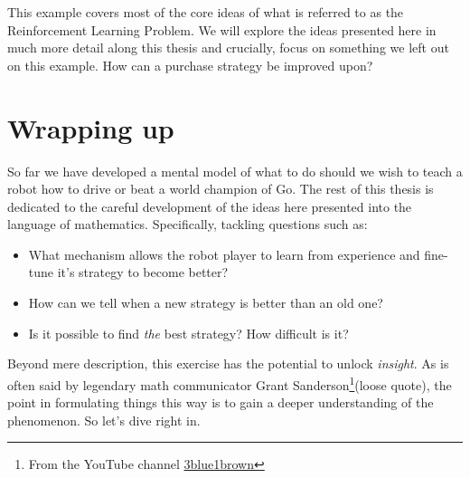 This example covers most of the core ideas of what is referred 
to as the Reinforcement Learning Problem. We will explore the 
ideas presented here in much more detail along this thesis and 
crucially, focus on something we left out on this example. How 
can a purchase strategy be improved upon?

\section{Wrapping up}
So far we have developed a mental model of what to do should we 
wish to teach a robot how to drive or beat a world champion of 
Go. The rest of this thesis is dedicated to the careful 
development of the ideas here presented into the language of 
mathematics. Specifically, tackling questions such as:
\begin{itemize}
	\item What mechanism allows the robot player to learn from 
	experience and fine-tune it's strategy to become better?
	\item How can we tell when a new strategy is better than an 
	old one?
	\item Is it possible to find \textit{the} best strategy? 
	How difficult is it?
\end{itemize}

Beyond mere description, this exercise has the potential to 
unlock \textit{insight}. As is often said by legendary math 
communicator Grant Sanderson\footnote{From the YouTube channel 
\href{https://www.youtube.com/channel/UCYO_jab_esuFRV4b17AJtAw}{3blue1brown}}(loose 
quote), the point in formulating things this way is to gain a 
deeper understanding of the phenomenon. So let's dive right in.

